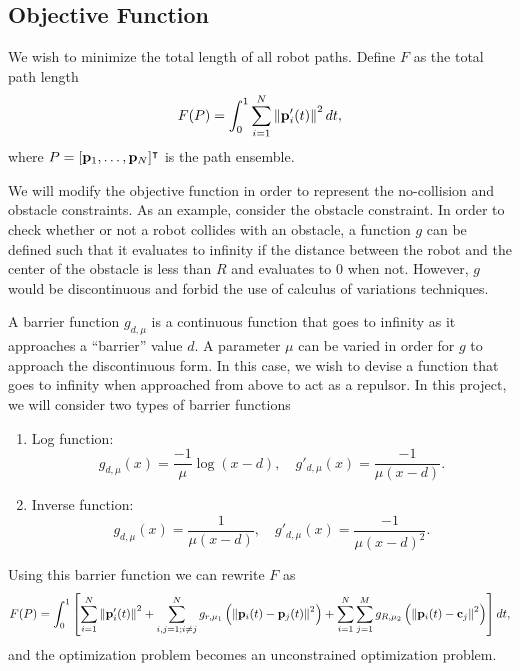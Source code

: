 \documentclass[11pt]{article}
\begin{document}
\subsection{Objective Function}

We wish to minimize the total length of all robot paths. Define \(F\) as the total path length
\begin{equation}
    F(P) = \int_0^1 \sum_{i=1}^{N} \left\lVert \mathbf{p}_i'(t) \right\rVert^2 dt,
\end{equation}
where \(P = [\mathbf{p}_1, \ldots, \mathbf{p}_N]^\intercal\) is the path ensemble.

We will modify the objective function in order to represent the no-collision and obstacle constraints. As an example, consider the obstacle constraint. In order to check whether or not a robot collides with an obstacle, a function \(g\) can be defined such that it evaluates to infinity if the distance between the robot and the center of the obstacle is less than \(R\) and evaluates to 0 when not. However, \(g\) would be discontinuous and forbid the use of calculus of variations techniques.

A barrier function \(g_{d,\mu}\) is a continuous function that goes to infinity as it approaches a ``barrier'' value \(d\). A parameter \(\mu\) can be varied in order for \(g\) to approach the discontinuous form. In this case, we wish to devise a function that goes to infinity when approached from above to act as a repulsor. In this project, we will consider two types of barrier functions
\begin{enumerate}
    \item Log function:
    \begin{equation}
        g_{d,\mu}(x) = \frac{-1}{\mu} \log(x-d),
        \quad
        g'_{d,\mu}(x) = \frac{-1}{\mu(x-d)}.
    \end{equation}
    \item Inverse function:
    \begin{equation}
        g_{d,\mu}(x) = \frac{1}{\mu(x-d)},
        \quad
        g'_{d,\mu}(x) = \frac{-1}{\mu(x-d)^2}.
    \end{equation}
\end{enumerate}

Using this barrier function we can rewrite \(F\) as
\begin{equation}
    F(P) = \int_0^1 \left[ \sum_{i=1}^{N} \left\lVert \mathbf{p}'_i(t) \right\rVert^2 + \sum_{i,j = 1; i \neq j}^{N} g_{r,\mu_1}\left( \left\lVert \mathbf{p}_i(t) - \mathbf{p}_j(t) \right\rVert^2 \right) + \sum_{i=1}^{N} \sum_{j=1}^{M} g_{R,\mu_2}\left( \left\lVert \mathbf{p}_i(t) - \mathbf{c}_j \right\rVert^2 \right) \right] dt,
\end{equation}
and the optimization problem becomes an unconstrained optimization problem.
\end{document}

